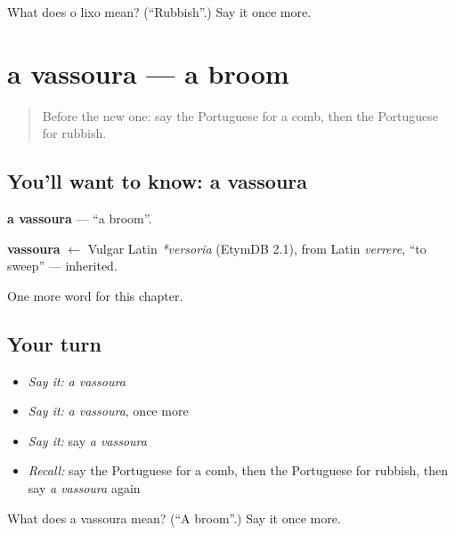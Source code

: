 \begin{tcolorbox}[breakable,colback=teal!4,colframe=teal!35!black,title={Before you move on}]
What does o lixo mean? (\textquotedblleft{}Rubbish\textquotedblright{}.) Say it once more.
\end{tcolorbox}
\section[a vassoura]{a vassoura — a broom}

\label{lesson:PT-C96-vassoura}



\begin{quote}
Before the new one: say the Portuguese for a comb, then the Portuguese for rubbish.
\end{quote}

\subsection*{You'll want to know: a vassoura}
\textbf{a vassoura} — \textquotedblleft{}a broom\textquotedblright{}.

\begin{cousinweb}
\textbf{vassoura} $\leftarrow$ Vulgar Latin \emph{*versoria} (EtymDB 2.1), from Latin \emph{verrere}, \textquotedblleft{}to sweep\textquotedblright{} — inherited.
\end{cousinweb}

\begin{grammarlens}[title={What you've built}]
One more word for this chapter.
\end{grammarlens}

\subsection*{Your turn}
\begin{itemize}
\raggedright
  \item \emph{Say it:} \emph{a vassoura}
  \item \emph{Say it:} \emph{a vassoura}, once more
  \item \emph{Say it:} say \emph{a vassoura}
  \item \emph{Recall:} say the Portuguese for a comb, then the Portuguese for rubbish, then say \emph{a vassoura} again
\end{itemize}

\begin{tcolorbox}[breakable,colback=teal!4,colframe=teal!35!black,title={Before you move on}]
What does a vassoura mean? (\textquotedblleft{}A broom\textquotedblright{}.) Say it once more.
\end{tcolorbox}
